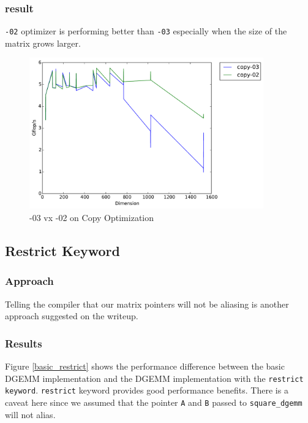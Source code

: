 \documentclass[11pt]{article}
\theoremstyle{plain}
\theoremstyle{definition}
\begin{document}
\subsubsection{result}
\texttt{-02} optimizer is performing better than \texttt{-03}  especially when the size of the matrix grows larger.
\begin{figure}[H]
    \includegraphics[width=0.9\textwidth]{timing_flag0203_copy.pdf}
    \caption{-03 vx -02 on Copy Optimization}
    \label{0203}
\end{figure}
 

\subsection{Restrict Keyword}

\subsubsection{Approach}
Telling the compiler that our matrix pointers will not be aliasing is another approach suggested on the writeup. 
\subsubsection{Results}

Figure \ref{basic_restrict} shows the performance difference between the basic DGEMM implementation and the DGEMM implementation with the \texttt{restrict keyword}. \texttt{restrict} keyword provides good performance benefits. There is a caveat here since we assumed that the pointer \texttt{A} and \texttt{B} passed to \texttt{square\_dgemm} will not alias. 
\end{document}
